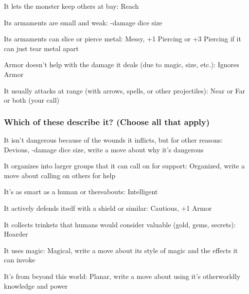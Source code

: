          
\item It lets the monster keep others at bay: Reach

         
\item Its armaments are small and weak: -damage dice size

         
\item Its armaments can slice or pierce metal: Messy, +1 Piercing or +3 Piercing if it can just tear metal apart

         
\item Armor doesn't help with the damage it deals (due to magic, size, etc.): Ignores Armor

         
\item It usually attacks at range (with arrows, spells, or other projectiles): Near or Far or both (your call)

       
\stopitemize
       
\subsubsection{Which of these describe it? (Choose all that apply)}     
       
\startitemize[1,packed]
         
\item It isn't dangerous because of the wounds it inflicts, but for other reasons: Devious, -damage dice size, write a move about why it's dangerous

         
\item It organizes into larger groups that it can call on for support: Organized, write a move about calling on others for help

         
\item It's as smart as a human or thereabouts: Intelligent

         
\item It actively defends itself with a shield or similar: Cautious, +1 Armor

         
\item It collects trinkets that humans would consider valuable (gold, gems, secrets): Hoarder

         
\item It uses magic: Magical, write a move about its style of magic and the effects it can invoke

         
\item It's from beyond this world: Planar, write a move about using it's otherworldly knowledge and power

